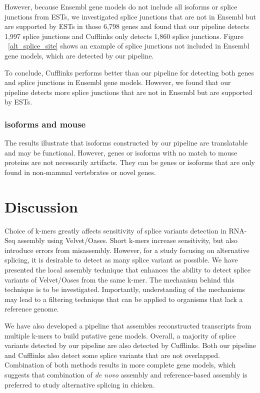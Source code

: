 \documentclass[10pt]{article}
\begin{document}
However, because Ensembl gene models do not include all isoforms or
splice junctions from ESTs, we investigated splice junctions that are
not in Ensembl but are supported by ESTs in those 6,798 genes and
found that our pipeline detects 1,997 splice junctions and Cufflinks
only detects 1,860 splice junctions.
Figure ~\ref{alt_splice_site} shows an example of splice junctions not
included in Ensembl gene models, which are detected by our pipeline.

To conclude, Cufflinks performs better than our pipeline for detecting
both genes and splice junctions in Ensembl gene models.
However, we found that our pipeline detects more splice junctions
that are not in Ensembl but are supported by ESTs.

\subsubsection*{isoforms and mouse}

The results illustrate that isoforms constructed
by our pipeline are translatable and may be functional.  However,
genes or isoforms with no match to mouse proteins are not necessarily
artifacts.  They can be genes or isoforms that are only found in
non-mammal vertebrates or novel genes.


\section*{Discussion}

Choice of k-mers greatly affects sensitivity of splice variants detection in RNA-Seq assembly using Velvet/Oases.
Short k-mers increase sensitivity, but also introduce errors from misassembly.
However, for a study focusing on alternative splicing, it is desirable to detect as many splice variant as possible.
We have presented the local assembly technique that enhances the ability to detect splice variants of Velvet/Oases from the same
k-mer.
The mechanism behind this technique is to be investigated.
Importantly, understanding of the mechanisms may lead to a filtering technique that can be applied to organisms that lack a reference genome.

We have also developed a pipeline that assembles reconstructed transcripts from multiple k-mers to build putative gene models.
Overall, a majority of splice variants detected by our pipeline are also detected by Cufflinks.
Both our pipeline and Cufflinks also detect some splice variants that are not overlapped.
Combination of both methods results in more complete gene models,
which suggests that combination of \emph{de novo} assembly and reference-based assembly is preferred to study alternative splicing in chicken.
\end{document}
